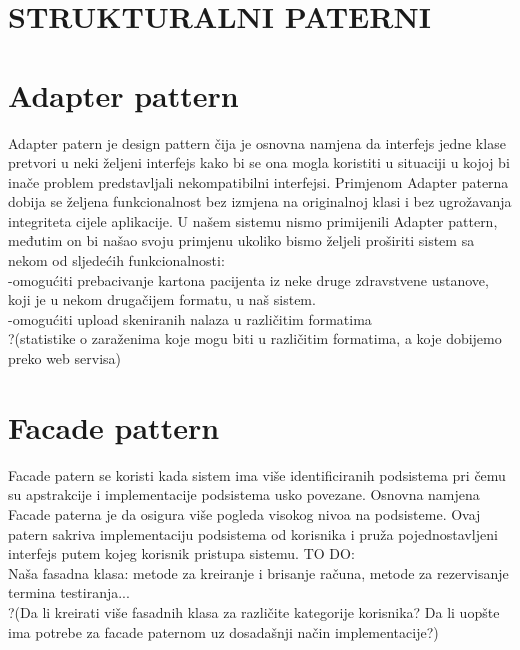 \documentclass{article}
\begin{document}
\onehalfspacing

\section*{\huge STRUKTURALNI PATERNI}
\vspace{10mm}
\section*{Adapter pattern}
\vspace{1mm}

Adapter patern je design pattern čija je osnovna namjena da interfejs jedne klase pretvori u neki željeni interfejs kako bi se ona mogla koristiti u situaciji u kojoj bi inače problem predstavljali nekompatibilni interfejsi. Primjenom Adapter paterna dobija se željena funkcionalnost bez izmjena na originalnoj klasi i bez ugrožavanja integriteta cijele aplikacije.
U našem sistemu nismo primijenili Adapter pattern, međutim on bi našao svoju primjenu ukoliko bismo željeli proširiti sistem sa nekom od sljedećih funkcionalnosti:\\
-omogućiti prebacivanje kartona pacijenta iz neke druge zdravstvene ustanove, koji je u nekom drugačijem formatu, u naš sistem.\\
-omogućiti upload skeniranih nalaza u različitim formatima\\
?(statistike o zaraženima koje mogu biti u različitim formatima, a koje dobijemo preko web servisa)\\

\section*{Facade pattern}
\vspace{1mm}
Facade patern se koristi kada sistem ima više identificiranih podsistema pri čemu su apstrakcije i implementacije podsistema usko povezane. Osnovna namjena Facade paterna je da osigura više pogleda visokog nivoa na podsisteme. Ovaj patern sakriva implementaciju podsistema od korisnika i pruža pojednostavljeni interfejs putem kojeg korisnik pristupa sistemu.
\flushleft
TO DO:\\
Naša fasadna klasa: metode za kreiranje i brisanje računa, metode za rezervisanje termina testiranja...\\
?(Da li kreirati više fasadnih klasa za različite kategorije korisnika? Da li uopšte ima potrebe za facade paternom uz dosadašnji način implementacije?)
\end{document}
